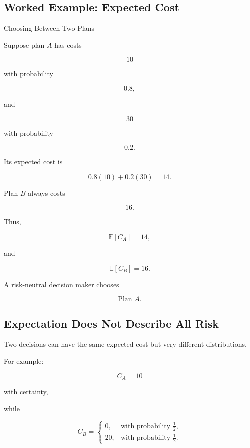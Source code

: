 \subsection{Worked Example: Expected Cost}
\label{subsec:worked-expected-cost}

\begin{workedexamplebox}{Choosing Between Two Plans}

Suppose plan \(A\) has costs

\[
10
\]

with probability

\[
0.8,
\]

and

\[
30
\]

with probability

\[
0.2.
\]

Its expected cost is

\[
0.8(10)+0.2(30)
=
14.
\]

Plan \(B\) always costs

\[
16.
\]

Thus,

\[
\mathbb{E}[C_A]=14,
\]

and

\[
\mathbb{E}[C_B]=16.
\]

A risk-neutral decision maker chooses

\begin{answerbox}
\[
\boxed{
\text{Plan }A.
}
\]
\end{answerbox}

\end{workedexamplebox}

\subsection{Expectation Does Not Describe All Risk}
\label{subsec:expectation-not-all-risk}

Two decisions can have the same expected cost but very different
distributions.

For example:

\[
C_A
=
10
\]

with certainty,

while

\[
C_B
=
\begin{cases}
0,
&
\text{with probability }\frac12,
\\
20,
&
\text{with probability }\frac12.
\end{cases}
\]

